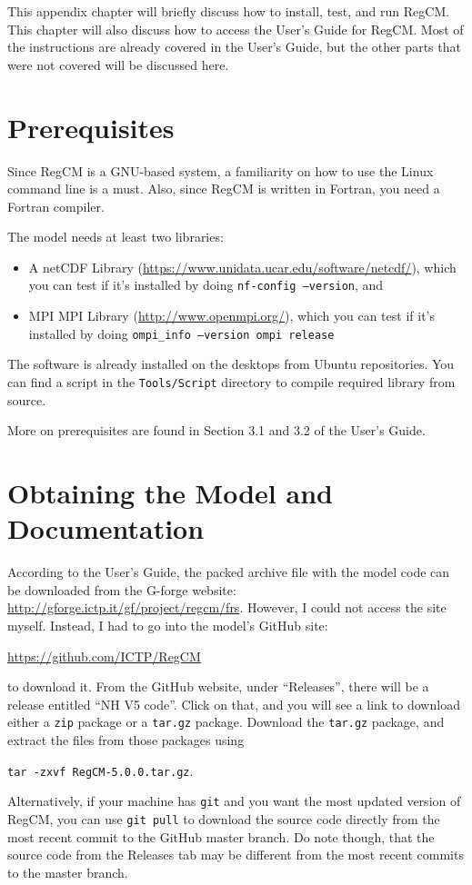 This appendix chapter will briefly discuss how to install, test, and run RegCM.
This chapter will also discuss how to access the User's Guide for RegCM.
Most of the instructions are already covered in the User's Guide,
	but the other parts that were not covered will be discussed here.

\section{Prerequisites}
	Since RegCM is a GNU-based system, a familiarity on how to use the Linux command line is a must.
	Also, since RegCM is written in Fortran, you need a Fortran compiler.
	
	The model needs at least two libraries:
	\begin{itemize}
		\item A netCDF Library 
		(\url{https://www.unidata.ucar.edu/software/netcdf/}),
		which you can test if it's installed by doing
		\texttt{nf-config --version},
		and
		\item MPI MPI Library
		(\url{http://www.openmpi.org/}),
		which you can test if it's installed by doing
		\texttt{ompi\_info --version ompi release}
	\end{itemize}
	The software is already installed on the desktops from Ubuntu
	repositories. You can find a script in the \texttt{Tools/Script} directory
	to compile required library from source.
	
	More on prerequisites are found in Section 3.1 and 3.2 of the User's Guide.
	
\section{Obtaining the Model and Documentation}
	According to the User's Guide, the packed archive file with the model code can be downloaded from the G-forge website: 
		\url{http://gforge.ictp.it/gf/project/regcm/frs}.
	However, I could not access the site myself.
	Instead, I had to go into the model's GitHub site:
	\begin{center}
		\url{https://github.com/ICTP/RegCM}
	\end{center}
	to download it.
	From the GitHub website, under ``Releases'', there will be a release entitled ``NH V5 code''.
	Click on that, and you will see a link to download either a \texttt{zip} package or a \texttt{tar.gz} package.
	Download the \texttt{tar.gz} package, and extract the files from those packages using
	\begin{center}
		\texttt{tar -zxvf RegCM-5.0.0.tar.gz}.
	\end{center}
	Alternatively, if your machine has \texttt{git} and you want the most updated version of RegCM, you can use \texttt{git pull} to download the source code directly from the most recent commit to the GitHub master branch.
	Do note though, that the source code from the Releases tab may be different from the most recent commits to the master branch.

